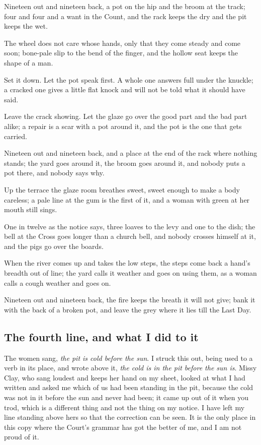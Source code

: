 \documentclass{design/chronicle}
\begin{document}
Nineteen out and nineteen back, a pot on the hip and the broom at the track; four and four and a want in the Count, and the rack keeps the dry and the pit keeps the wet.

The wheel does not care whose hands, only that they come steady and come soon; bone-pale slip to the bend of the finger, and the hollow seat keeps the shape of a man.

Set it down. Let the pot speak first. A whole one answers full under the knuckle; a cracked one gives a little flat knock and will not be told what it should have said.

Leave the crack showing. Let the glaze go over the good part and the bad part alike; a repair is a scar with a pot around it, and the pot is the one that gets carried.

Nineteen out and nineteen back, and a place at the end of the rack where nothing stands; the yard goes around it, the broom goes around it, and nobody puts a pot there, and nobody says why.

Up the terrace the glaze room breathes sweet, sweet enough to make a body careless; a pale line at the gum is the first of it, and a woman with green at her mouth still sings.

One in twelve as the notice says, three loaves to the levy and one to the dish; the bell at the Cross goes longer than a church bell, and nobody crosses himself at it, and the pigs go over the boards.

When the river comes up and takes the low steps, the steps come back a hand’s breadth out of line; the yard calls it weather and goes on using them, as a woman calls a cough weather and goes on.

Nineteen out and nineteen back, the fire keeps the breath it will not give; bank it with the back of a broken pot, and leave the grey where it lies till the Last Day.

\subsection*{The fourth line, and what I did to it}

The women sang, \emph{the pit is cold before the sun}. I struck this out, being used to a verb in its place, and wrote above it, \emph{the cold is in the pit before the sun is}. Missy Clay, who sang loudest and keeps her hand on my sheet, looked at what I had written and asked me which of us had been standing in the pit, because the cold was not in it before the sun and never had been; it came up out of it when you trod, which is a different thing and not the thing on my notice. I have left my line standing above hers so that the correction can be seen. It is the only place in this copy where the Court’s grammar has got the better of me, and I am not proud of it.
\end{document}
